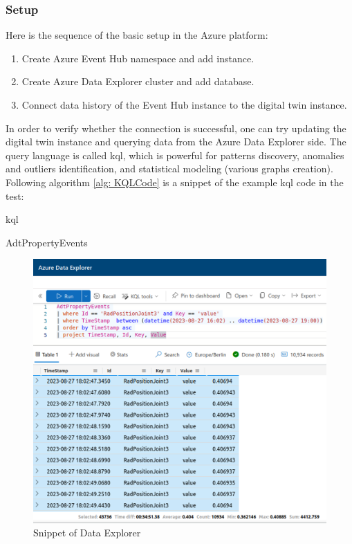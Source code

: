 \subsubsection{Setup}
Here is the sequence of the basic setup in the Azure platform:
\begin{enumerate}
    \item Create Azure Event Hub namespace and add instance.
    \item Create Azure Data Explorer cluster and add database.
    \item Connect data history of the Event Hub instance to the digital twin instance.
\end{enumerate}

In order to verify whether the connection is successful, one can try updating the 
digital twin instance and querying data from the Azure Data Explorer side. The query
language is called \gls{kql}, which is powerful for patterns discovery, anomalies 
and outliers identification, and statistical modeling (various graphs creation). 
Following algorithm \ref{alg: KQLCode} is a snippet of the example \gls{kql} code in the test: 

\begin{algorithm}
    \caption{\gls{kql}}
    \label{alg: KQLCode}
    \begin{algorithmic}
        \State  AdtPropertyEvents 
    \end{algorithmic}
\end{algorithm}


\begin{figure}[htb]
    \includegraphics[width=\textwidth]{figures/KQL_cut.jpg}
    
    \centering
    \caption{Snippet of Data Explorer\label{fig: KQL}}
\end{figure}

